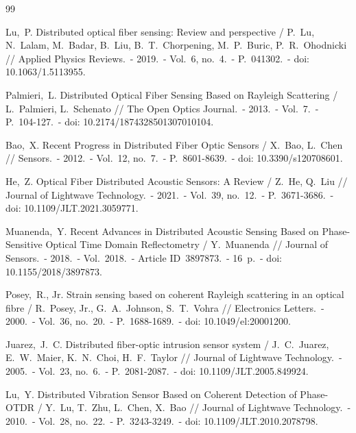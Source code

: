 \documentclass[12pt,a4paper]{extarticle}
\begin{document}
\newpage

\renewcommand{\refname}{\hfill Список использованных источников \hfill}

\begin{thebibliography}{99}
  \fontsize{12}{14}\selectfont

  Lu,~P. Distributed optical fiber sensing: Review and perspective / P.~Lu, N.~Lalam, M.~Badar, B.~Liu, B.~T.~Chorpening, M.~P.~Buric, P.~R.~Ohodnicki // Applied Physics Reviews.~- 2019.~- Vol.~6, no.~4.~- P.~041302.~- doi: 10.1063/1.5113955.

  Palmieri,~L. Distributed Optical Fiber Sensing Based on Rayleigh Scattering / L.~Palmieri, L.~Schenato // The Open Optics Journal.~- 2013.~- Vol.~7.~- P.~104-127.~- doi: 10.2174/1874328501307010104.

  Bao,~X. Recent Progress in Distributed Fiber Optic Sensors / X.~Bao, L.~Chen // Sensors.~- 2012.~- Vol.~12, no.~7.~- P.~8601-8639.~- doi: 10.3390/s120708601.

  He,~Z. Optical Fiber Distributed Acoustic Sensors: A Review / Z.~He, Q.~Liu // Journal of Lightwave Technology.~- 2021.~- Vol.~39, no.~12.~- P.~3671-3686.~- doi: 10.1109/JLT.2021.3059771.

  Muanenda,~Y. Recent Advances in Distributed Acoustic Sensing Based on Phase-Sensitive Optical Time Domain Reflectometry / Y.~Muanenda // Journal of Sensors.~- 2018.~- Vol.~2018.~- Article ID~3897873.~- 16~p.~- doi: 10.1155/2018/3897873.

  Posey,~R., Jr. Strain sensing based on coherent Rayleigh scattering in an optical fibre / R.~Posey, Jr., G.~A.~Johnson, S.~T.~Vohra // Electronics Letters.~- 2000.~- Vol.~36, no.~20.~- P.~1688-1689.~- doi: 10.1049/el:20001200.

  Juarez,~J.~C. Distributed fiber-optic intrusion sensor system / J.~C.~Juarez, E.~W.~Maier, K.~N.~Choi, H.~F.~Taylor // Journal of Lightwave Technology.~- 2005.~- Vol.~23, no.~6.~- P.~2081-2087.~- doi: 10.1109/JLT.2005.849924.

  Lu,~Y. Distributed Vibration Sensor Based on Coherent Detection of Phase-OTDR / Y.~Lu, T.~Zhu, L.~Chen, X.~Bao // Journal of Lightwave Technology.~- 2010.~- Vol.~28, no.~22.~- P.~3243-3249.~- doi: 10.1109/JLT.2010.2078798.


\end{thebibliography}
\end{document}
